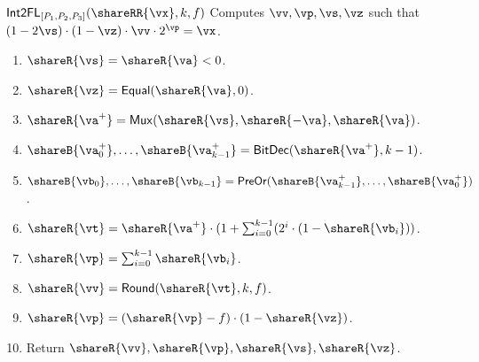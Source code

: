 \msubsubsection
  {$\mathsf{Int2FL}_{[P_1, P_2, P_3]}(\shareRR{\vx}, k, f)$}
  Computes $\vv, \vp, \vs, \vz$ such that $(1 - 2\vs) \cdot (1- \vz) \cdot \vv \cdot 2^\vp  = \vx$.
\begin{enumerate}
    \item $\shareR{\vs} = \shareR{\va} < 0$.
    \item $\shareR{\vz} = \mathsf{Equal}(\shareR{\va}, 0)$.
    \item $\shareR{\va^+} = \mathsf{Mux}(\shareR{\vs}, \shareR{-\va}, \shareR{\va})$.
    \item $\shareB{\va^+_0}, \dots, \shareB{\va^+_{k-1}} = \mathsf{BitDec}(\shareR{\va^+}, k-1)$.
    \item $\shareB{\vb_0}, \dots, \shareB{\vb_{k-1}} = \mathsf{PreOr}(\shareB{\va^+_{k-1}}, \dots, \shareB{\va^+_0})$.
    \item $\shareR{\vt} = \shareR{\va^+} \cdot (1 + \sum_{i=0}^{k-1} (2^i \cdot (1 - \shareR{\vb_i}))$.
    \item $\shareR{\vp} = \sum_{i=0}^{k-1} \shareR{\vb_i}$.
    \item $\shareR{\vv} = \mathsf{Round}(\shareR{\vt} , k, f)$.
    \item $\shareR{\vp} = (\shareR{\vp} - f) \cdot (1 - \shareR{\vz})$.
    \item Return $\shareR{\vv}, \shareR{\vp}, \shareR{\vs}, \shareR{\vz}$.
\end{enumerate}

